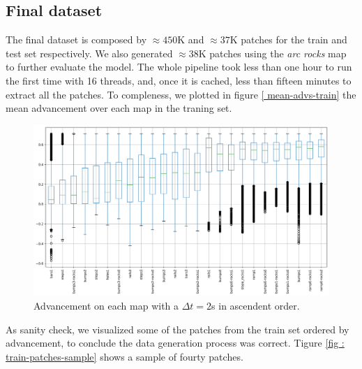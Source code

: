 \documentclass[../document.tex]{subfiles}
\begin{document}
\subsection{Final dataset}
The final dataset is composed by $\approx 450$K and $\approx 37$K patches for the train and test set respectively. We also generated $\approx 38$K patches using the \emph{arc rocks} map to further evaluate the model. The whole pipeline took less than one hour to run the first time with 16 threads, and, once it is cached, less than fifteen minutes to extract all the patches. To compleness, we plotted in figure \ref{ mean-advs-train} the mean advancement over each map in the traning set. 
\begin{figure}[htbp]
    \centering
    \includegraphics[width=\linewidth]{../img/datasets/box_for_each_map.png}
    \caption{Advancement on each map with a $\Delta t = 2$s in ascendent order.}
    \label{fig : mean-advs-train}
\end{figure}
As sanity check, we visualized some of the patches from the train set ordered by advancement, to conclude the data generation process was correct. Tigure \ref{fig : train-patches-sample} shows a sample of fourty patches.
\end{document}
